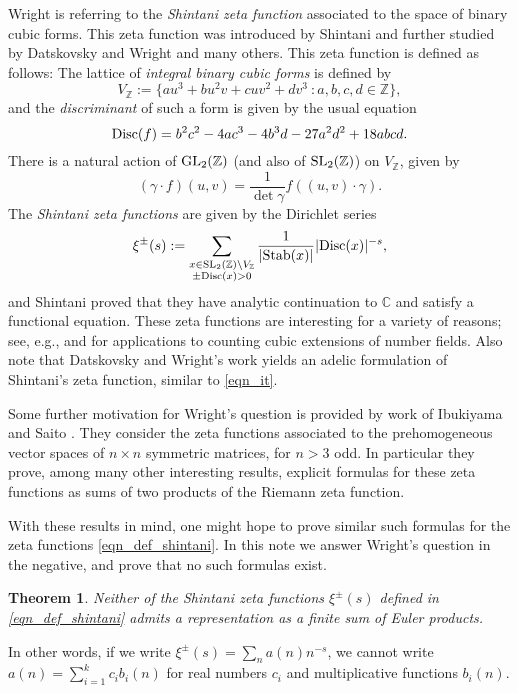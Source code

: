 \documentclass[12pt]{amsart}
\newtheorem{theorem}{Theorem}
\theoremstyle{remark}
\numberwithin{theorem}{section} \numberwithin{equation}{section}
\newcommand{\C}{\mathbb{C}}
\newcommand{\Z}{\mathbb{Z}}
\newcommand{\SL}{{\text {\rm SL}}}
\newcommand{\GL}{{\text {\rm GL}}}
\newcommand{\Disc}{\textnormal{Disc}}
\newcommand{\Stab}{\textnormal{Stab}}
\begin{document}
Wright is referring to the {\itshape Shintani zeta function} associated to the space of binary cubic forms.
This zeta function was introduced by Shintani \cite{S} and further studied by Datskovsky and Wright \cite{DW1, DW2, DW3} and 
many others. This zeta function is defined as follows:
The lattice of {\itshape integral binary cubic forms} is defined by
\begin{equation}\label{def_vz}
V_{\Z} := \{ a u^3 + b u^2 v + c u v^2 + d v^3 \ : a, b, c, d \in \Z \},
\end{equation}
and the {\itshape discriminant} of such a form is given by the usual equation
\begin{equation}\label{eqn_disc_formula}
\Disc(f) = b^2 c^2 - 4 a c^3 - 4 b^3 d - 27 a^2 d^2 + 18 abcd.
\end{equation}
There is a natural action of $\GL_2(\Z)$ (and also of $\SL_2(\Z)$) on $V_{\Z}$, given by
\begin{equation}
(\gamma \cdot f)(u, v) = \frac{1}{\det \gamma} f((u, v) \cdot \gamma).
\end{equation}
The {\itshape Shintani zeta functions} are given by the Dirichlet series
\begin{equation}\label{eqn_def_shintani}
\xi^{\pm}(s) := \sum_{\substack{x \in \SL_2(\Z) \backslash V_{\Z} \\ \pm \Disc(x) > 0}} \frac{1}{|\Stab(x)|} |\Disc(x)|^{-s},
\end{equation}
and Shintani proved that they have analytic continuation to $\C$ and satisfy a functional equation.
These zeta functions are interesting for a variety of reasons; see, e.g., \cite{TT} and \cite{DW3} for
applications to counting cubic extensions of number fields. Also note that Datskovsky and Wright's
work yields an adelic formulation of Shintani's zeta function, similar to \eqref{eqn_it}.

Some further motivation for Wright's question is provided by work of Ibukiyama and Saito \cite{IS}.
They consider the zeta functions associated to the prehomogeneous vector spaces of $n \times n$
symmetric matrices, for $n > 3$ odd. In particular they prove, among many other interesting results, 
explicit formulas for these zeta functions as sums of two products of the Riemann zeta function. 

With these results in mind, one might hope to prove similar such formulas 
for the zeta functions \eqref{eqn_def_shintani}. In this note we answer Wright's
question in the negative, and prove that no such formulas exist.
\begin{theorem}\label{thm_main}
Neither of the Shintani zeta functions $\xi^{\pm}(s)$ defined in \eqref{eqn_def_shintani} admits a
representation as a finite sum of Euler products.
\end{theorem}
In other words, if we write $\xi^{\pm}(s) = \sum_n a(n) n^{-s}$, we cannot write $a(n) = \sum_{i = 1}^k c_i b_i(n)$
for real numbers $c_i$ and multiplicative functions $b_i(n)$.
\end{document}
